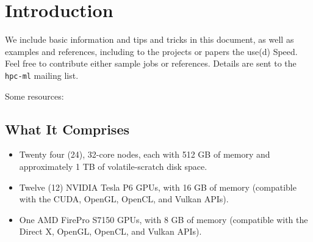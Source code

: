 \documentclass{easychair}
\begin{document}
\section{Introduction}

We include basic information and tips and tricks in this document,
as well as examples and references, including to the projects or
papers the use(d) Speed. Feel free to contribute either sample jobs
or references. Details are sent to the \texttt{hpc-ml} mailing list.

Some resources:


\subsection{What It Comprises}

\begin{itemize}
\item
Twenty four (24), 32-core nodes, each with 512 GB of memory and approximately 1 TB of volatile-scratch disk space. 
\item
Twelve (12) NVIDIA Tesla P6 GPUs, with 16 GB of memory (compatible with the CUDA, OpenGL, OpenCL, and Vulkan APIs). 
\item
One AMD FirePro S7150 GPUs, with 8 GB of memory (compatible with the Direct X, OpenGL, OpenCL, and Vulkan APIs). 
\end{itemize}
\end{document}
